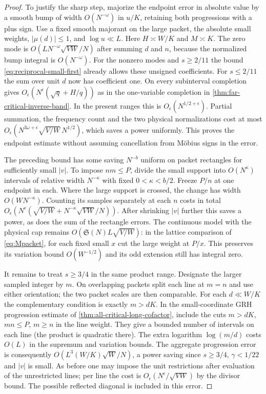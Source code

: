 \documentclass[11pt,a4paper]{article}
\numberwithin{equation}{section}
\newcommand{\SSS}{\mathfrak S}
\begin{document}
\begin{proof}
To justify the sharp step, majorize the endpoint error in
absolute value by a smooth bump of width $O(N^{-\omega})$
in $u/K$, retaining both progressions with a plus sign.
Use a fixed smooth majorant on the large packet, the absolute
small weights, $|\mu(d)|\le1$, and $\log u\ll L$. Here
$H\asymp W/K$ and $M\asymp K$. The zero mode is
$O(L N^{-\omega}\sqrt{VW}/N)$ after summing $d$ and $n$,
because the normalized bump integral is $O(N^{-\omega})$.
For the nonzero modes and $s\ge2/11$ the bound
\eqref{eq:reciprocal-small-first} already allows these unsigned
coefficients. For $s\le2/11$ the sum over unit $d$ now has
coefficient one. On every subinterval completion gives
$O_\epsilon(N^\epsilon(\sqrt q+H/q))$ as in the one-variable
completion in \cref{thm:far-critical-inverse-band}. In the
present ranges this is $O_\epsilon(N^{1/2+\epsilon})$.
Partial summation, the frequency count and the two physical
normalizations cost at most
$O_\epsilon(N^{3\omega+\epsilon}\sqrt{V/W}\,N^{1/2})$,
which saves a power uniformly. This proves the endpoint estimate
without assuming cancellation from M\"obius signs in the error.

The preceding bound has some saving $N^{-b}$ uniform on packet
rectangles for sufficiently small $|v|$. To impose $nm\le P$,
divide the small support into $O(N^\kappa)$ intervals of relative
width $N^{-\kappa}$ with fixed $0<\kappa<b/2$. Freeze $P/n$
at one endpoint in each. Where the large support is crossed,
the change has width $O(WN^{-\kappa})$. Counting its samples
separately at each $n$ costs in total
$O_\epsilon(N^\epsilon(\sqrt{V/W}+N^{-\kappa}\sqrt{VW}/N))$.
After shrinking $|v|$ further this saves a power, as does the
sum of the rectangle errors. The continuous model with the
physical cap remains $O(\SSS(N)L\sqrt{V/W})$: in the lattice
comparison of \eqref{eq:Mpacket}, for each fixed small $x$ cut
the large weight at $P/x$. This preserves its variation bound
$O(W^{-1/2})$ and its odd extension still has integral zero.

It remains to treat $s\ge3/4$ in the same product range.
Designate the larger sampled integer by $m$. On overlapping
packets split each line at $m=n$ and use either orientation;
the two packet scales are then comparable. For each $d\ll W/K$
the complementary condition is exactly $m>dK$. In the
small-coordinate GRH progression estimate of
\cref{thm:all-critical-long-cofactor}, include the cuts
$m>dK$, $mn\le P$, $m\ge n$ in the line weight. They give
a bounded number of intervals on each line (the product is
quadratic there). The extra logarithm $\log(m/d)$ costs $O(L)$
in the supremum and variation bounds. The aggregate progression
error is consequently $O(L^3(W/K)\sqrt W/N)$, a power saving
since $s\ge3/4$, $\gamma<1/22$ and $|v|$ is small. As before
one may impose the unit restrictions after evaluation of the
unrestricted lines; per line the cost is
$O_\epsilon(N^\epsilon/\sqrt{VW})$ by the divisor bound.
The possible reflected diagonal is included in this error.


\end{proof}
\end{document}
